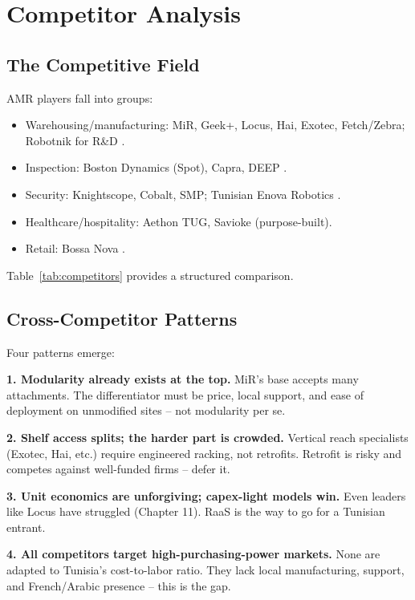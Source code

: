 \chapter{Competitor Analysis}

\section{The Competitive Field}

AMR players fall into groups:
\begin{itemize}
    \item Warehousing/manufacturing: MiR, Geek+, Locus, Hai, Exotec, Fetch/Zebra; Robotnik for R\&D \cite{standardbots_amr,fdatabot_amr2026,robotnik_kairos}.
    \item Inspection: Boston Dynamics (Spot), Capra, DEEP \cite{standardbots_amr,generationrobots_amr}.
    \item Security: Knightscope, Cobalt, SMP; Tunisian Enova Robotics \cite{mordor_security,coherent_security}.
    \item Healthcare/hospitality: Aethon TUG, Savioke (purpose-built).
    \item Retail: Bossa Nova \cite{mir_healthcare,nordmodules_retail}.
\end{itemize}

Table~\ref{tab:competitors} provides a structured comparison.

\section{Cross-Competitor Patterns} 
 
Four patterns emerge:

\textbf{1. Modularity already exists at the top.} MiR's base accepts many attachments. The differentiator must be price, local support, and ease of deployment on unmodified sites -- not modularity per se.

\textbf{2. Shelf access splits; the harder part is crowded.} Vertical reach specialists (Exotec, Hai, etc.) require engineered racking, not retrofits. Retrofit is risky and competes against well-funded firms -- defer it.

\textbf{3. Unit economics are unforgiving; capex-light models win.} Even leaders like Locus have struggled (Chapter 11). RaaS is the way to go for a Tunisian entrant.

\textbf{4. All competitors target high-purchasing-power markets.} None are adapted to Tunisia's cost-to-labor ratio. They lack local manufacturing, support, and French/Arabic presence -- this is the gap.


\newpage
